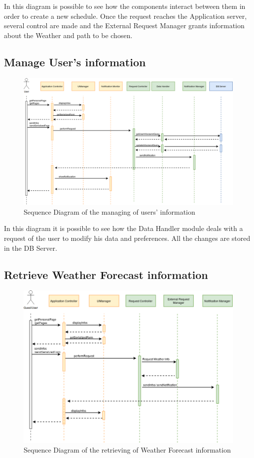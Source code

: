 \documentclass[numbers=noenddot, 12pt, a4paper, oneside]{scrbook}
\begin{document}
In this diagram is possible to see how the components interact between them in order to create a new schedule. Once the request reaches the Application server, several control are made and the External Request Manager grants information about the Weather and path to be chosen.


\subsection*{Manage User's information}

\begin{figure}[H]
	\centering
	\includegraphics[width=1.1\textwidth,angle=-0]{images/Goal3}
	\caption{Sequence Diagram of the managing of users' information}
\end{figure}

In this diagram it is possible to see how the Data Handler module deals with a request of the user to modify his data and preferences. All the changes are stored in the DB Server.


\subsection*{Retrieve Weather Forecast information}

\begin{figure}[H]
	\centering
	\includegraphics[width=1.1\textwidth,angle=-0]{images/Goal4}
	\caption{Sequence Diagram of the retrieving of Weather Forecast information}
\end{figure}
\end{document}
